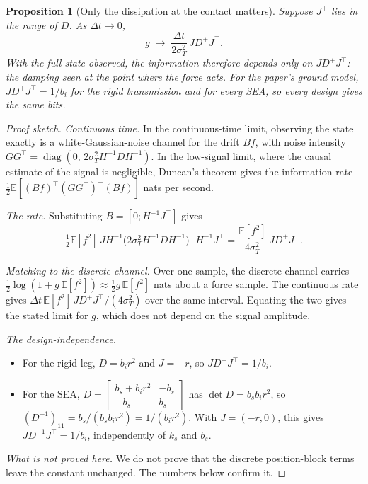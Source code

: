 \documentclass[11pt]{article}
\newtheorem{proposition}[theorem]{Proposition}
\theoremstyle{definition}
\theoremstyle{remark}
\newcommand{\E}{\mathbb{E}}
\newcommand{\diag}{\operatorname{diag}}
\begin{document}
\begin{proposition}[Only the dissipation at the contact matters]\label{prop:contact}
Suppose $J^\top$ lies in the range of $D$. As $\Delta t\to0$,
\[
  g\;\to\;\frac{\Delta t}{2\sigma_T^2}\,J D^+J^\top .
\]
With the full state observed, the information therefore depends only on $JD^+J^\top$: the
damping seen at the point where the force acts. For the paper's ground model, $JD^+J^\top=1/b_i$
for the rigid transmission and for every SEA, so every design gives the same bits.
\end{proposition}
\begin{proof}[Proof sketch]
\emph{Continuous time.} In the continuous-time limit, observing the state exactly is a
white-Gaussian-noise channel for the drift $Bf$, with noise intensity
$GG^\top=\diag(0,\,2\sigma_T^2H^{-1}DH^{-1})$. In the low-signal limit, where the causal
estimate of the signal is negligible, Duncan's theorem \citep{duncan1970calculation} gives
the information rate $\frac12\E[(Bf)^\top(GG^\top)^+(Bf)]$ nats per second.

\emph{The rate.} Substituting $B=[0;H^{-1}J^\top]$ gives
\[
  \tfrac12\E[f^2]\,JH^{-1}\big(2\sigma_T^2H^{-1}DH^{-1}\big)^+H^{-1}J^\top
  =\frac{\E[f^2]}{4\sigma_T^2}\,JD^+J^\top .
\]

\emph{Matching to the discrete channel.} Over one sample, the discrete channel carries
$\frac12\log(1+g\,\E[f^2])\approx\frac12g\,\E[f^2]$ nats about a force sample. The
continuous rate gives $\Delta t\,\E[f^2]\,JD^+J^\top/(4\sigma_T^2)$ over the same
interval. Equating the two gives the stated limit for $g$, which does not depend on the
signal amplitude.

\emph{The design-independence.}
\begin{itemize}[nosep]
  \item For the rigid leg, $D=b_ir^2$ and $J=-r$, so $JD^+J^\top=1/b_i$.
  \item For the SEA,
        $D=\left[\begin{smallmatrix}b_s+b_ir^2&-b_s\\-b_s&b_s\end{smallmatrix}\right]$ has
        $\det D=b_sb_ir^2$, so $(D^{-1})_{11}=b_s/(b_sb_ir^2)=1/(b_ir^2)$. With
        $J=(-r,0)$, this gives $JD^{-1}J^\top=1/b_i$, independently of $k_s$ and $b_s$.
\end{itemize}

\emph{What is not proved here.} We do not prove that the discrete position-block terms
leave the constant unchanged. The numbers below confirm it.
\end{proof}
\end{document}
